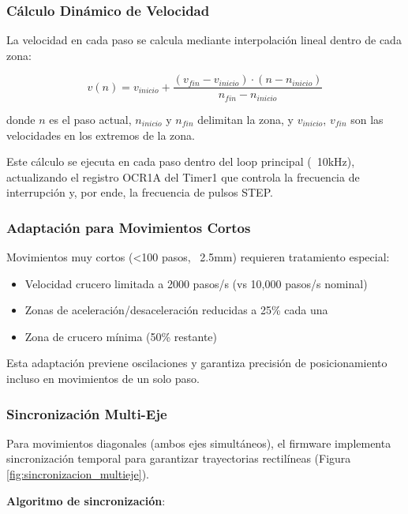 \subsubsection{Cálculo Dinámico de Velocidad}

La velocidad en cada paso se calcula mediante interpolación lineal dentro de cada zona:

\begin{equation}
v(n) = v_{inicio} + \frac{(v_{fin} - v_{inicio}) \cdot (n - n_{inicio})}{n_{fin} - n_{inicio}}
\end{equation}

donde $n$ es el paso actual, $n_{inicio}$ y $n_{fin}$ delimitan la zona, y $v_{inicio}$, $v_{fin}$ son las velocidades en los extremos de la zona.

Este cálculo se ejecuta en cada paso dentro del loop principal (~10kHz), actualizando el registro OCR1A del Timer1 que controla la frecuencia de interrupción y, por ende, la frecuencia de pulsos STEP.

\subsubsection{Adaptación para Movimientos Cortos}

Movimientos muy cortos (<100 pasos, ~2.5mm) requieren tratamiento especial:

\begin{itemize}
    \item Velocidad crucero limitada a 2000 pasos/s (vs 10,000 pasos/s nominal)
    \item Zonas de aceleración/desaceleración reducidas a 25\% cada una
    \item Zona de crucero mínima (50\% restante)
\end{itemize}

Esta adaptación previene oscilaciones y garantiza precisión de posicionamiento incluso en movimientos de un solo paso.

\subsubsection{Sincronización Multi-Eje}

Para movimientos diagonales (ambos ejes simultáneos), el firmware implementa sincronización temporal para garantizar trayectorias rectilíneas (Figura \ref{fig:sincronizacion_multieje}).

\textbf{Algoritmo de sincronización}:

